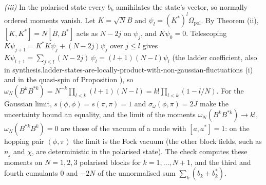 \emph{(iii)} In the polarised state every $b_{k}$ annihilates the state's vector, so normally ordered moments vanish. Let $K = \sqrt N B$ and $\psi_{l} = (K^{*})^{l}\Omega_{\mathrm{pol}}$. By Theorem (ii), $[K, K^{*}] = N[B, B^{*}]$ acts as $N - 2j$ on $\psi_{j}$, and $K\psi_{0} = 0$. Telescoping $K\psi_{j + 1} = K^{*}K\psi_{j} + (N - 2j)\psi_{j}$ over $j \le l$ gives $K\psi_{l + 1} = \sum_{j \le l}(N - 2j)\,\psi_{l} = (l + 1)(N - l)\psi_{l}$ (the ladder coefficient, also in synthesis.ladder-states-are-locally-product-with-non-gaussian-fluctuations (i) and in the quasi-spin of Proposition ), so $\omega_{N}(B^{k}B^{*k}) = N^{-k}\prod_{l < k}(l + 1)(N - l) = k!\prod_{l < k}(1 - l/N)$. For the Gaussian limit, $s(\phi, \phi) = s(\pi, \pi) = 1$ and $\sigma_{\omega}(\phi, \pi) = 2J$ make the uncertainty bound an equality, and the limit of the moments $\omega_{N}(B^{k}B^{*k}) \to k!$, $\omega_{N}(B^{*k}B^{k}) = 0$ are those of the vacuum of a mode with $[a, a^{*}] = 1$: on the hopping pair $(\phi, \pi)$ the limit is the Fock vacuum (the other block fields, such as $n_{j}$ and $\chi$, are deterministic in the polarised state). The check computes these moments on $N = 1, 2, 3$ polarised blocks for $k = 1, \dots, N + 1$, and the third and fourth cumulants $0$ and $-2N$ of the unnormalised sum $\sum_{k}(b_{k} + b_{k}^{*})$.
